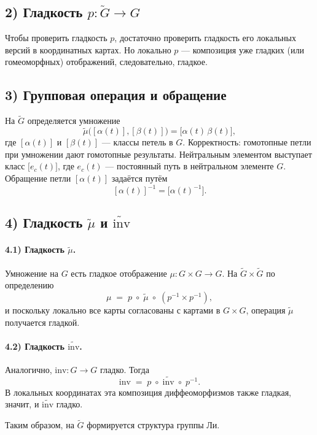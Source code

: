 \documentclass[12pt]{article}
\begin{document}
\begin{large}
\subsection*{2) Гладкость $p \colon \widetilde{G} \to G$}
Чтобы проверить гладкость $p$, достаточно проверить гладкость его локальных версий в координатных картах. Но локально $p$ --- композиция уже гладких (или гомеоморфных) отображений, следовательно, гладкое.

\subsection*{3) Групповая операция и обращение}
На $\widetilde{G}$ определяется умножение
\[
\widetilde{\mu}\bigl([\alpha(t)], [\beta(t)]\bigr) = \bigl[\alpha(t)\,\beta(t)\bigr],
\]
где $[\alpha(t)]$ и $[\beta(t)]$ --- классы петель в $G$. Корректность: гомотопные петли при умножении дают гомотопные результаты. Нейтральным элементом выступает класс $\bigl[e_c(t)\bigr]$, где $e_c(t)$ --- постоянный путь в нейтральном элементе $G$. Обращение петли $[\alpha(t)]$ задаётся путём
\[
[\alpha(t)]^{-1} = \bigl[\alpha(t)^{-1}\bigr].
\]

\subsection*{4) Гладкость $\widetilde{\mu}$ и $\widetilde{\mathrm{inv}}$}
\paragraph{4.1) Гладкость $\widetilde{\mu}$.}
Умножение на $G$ есть гладкое отображение $\mu \colon G \times G \to G$. На $\widetilde{G} \times \widetilde{G}$ по определению
\[
\mu \;=\; p \;\circ\; \widetilde{\mu}\;\circ\;(p^{-1} \times p^{-1}),
\]
и поскольку локально все карты согласованы с картами в $G \times G$, операция $\widetilde{\mu}$ получается гладкой.

\paragraph{4.2) Гладкость $\widetilde{\mathrm{inv}}$.}
Аналогично, $\mathrm{inv} \colon G \to G$ гладко. Тогда
\[
\mathrm{inv} \;=\; p \;\circ\; \widetilde{\mathrm{inv}} \;\circ\; p^{-1}.
\]
В локальных координатах эта композиция диффеоморфизмов также гладкая, значит, и $\widetilde{\mathrm{inv}}$ гладко.

Таким образом, на $\widetilde{G}$ формируется структура группы Ли.


\end{large}
\end{document}
